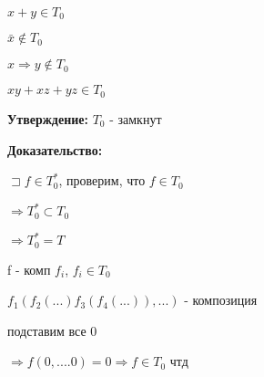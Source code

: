 \documentclass[russian]{lecture-notes}
\begin{document}
    $x+y \in T_{0}$

    $\bar{x} \notin T_{0}$

    $x \Rightarrow y \notin T_{0}$

    $xy + xz + yz \in T_{0}$

    \textbf{Утверждение:} $T_{0} $ - замкнут

    \textbf{Доказательство:}

    $\sqsupset f \in T_{0}^{*}$, проверим, что $f \in T_{0}$

    $\Rightarrow T_{0}^{*} \subset T_{0}$

    $\Rightarrow T_{0}^{*} = T$

    f - комп $f_{i}$, $f_{i} \in T_{0}$

    $f_{1}(f_{2}(...)f_{3}(f_{4}(...)),...)$ - композиция

    подставим все 0

    $\Rightarrow f(0,....0) = 0 \Rightarrow f \in T_{0} $ чтд
\end{document}
